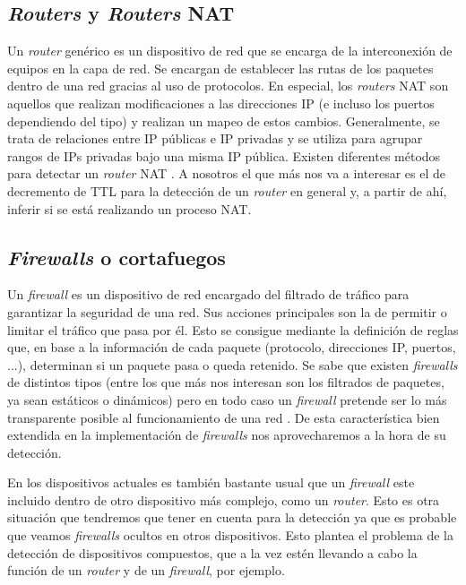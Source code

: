 \documentclass[tfg,epsbased,lof,lot,loa,final,nocopyright,overleaf]{tfgtfmthesisuam}
\begin{document}
\subsection{\textit{Routers} y \textit{Routers} NAT}
Un \textit{router} genérico es un dispositivo de red que se encarga de la interconexión de equipos en la capa de red. Se encargan de establecer las rutas de los paquetes dentro de una red gracias al uso de protocolos. En especial, los \textit{routers} NAT son aquellos que realizan modificaciones a las direcciones IP (e incluso los puertos dependiendo del tipo) y realizan un mapeo de estos cambios. Generalmente, se trata de relaciones entre IP públicas e IP privadas y se utiliza para agrupar rangos de IPs privadas bajo una misma IP pública. Existen diferentes métodos para detectar un \textit{router} NAT \cite{Krmicek}. A nosotros el que más nos va a interesar es el de decremento de TTL para la detección de un \textit{router} en general y, a partir de ahí, inferir si se está realizando un proceso NAT.

\subsection{\textit{Firewalls} o cortafuegos}
\label{subsec:Estado:Deteccion:Firewalls}
Un \textit{firewall} es un dispositivo de red encargado del filtrado de tráfico para garantizar la seguridad de una red. Sus acciones principales son la de permitir o limitar el tráfico que pasa por él. Esto se consigue mediante la definición de reglas que, en base a la información de cada paquete (protocolo, direcciones IP, puertos, ...), determinan si un paquete pasa o queda retenido. Se sabe que existen \textit{firewalls} de distintos tipos (entre los que más nos interesan son los filtrados de paquetes, ya sean estáticos o dinámicos) pero en todo caso un \textit{firewall} pretende ser lo más transparente posible al funcionamiento de una red \cite{Cheswick2003}. De esta característica bien extendida en la implementación de \textit{firewalls} nos aprovecharemos a la hora de su detección.

En los dispositivos actuales es también bastante usual que un \textit{firewall} este incluido dentro de otro dispositivo más complejo, como un \textit{router}. Esto es otra situación que tendremos que tener en cuenta para la detección ya que es probable que veamos \textit{firewalls} ocultos en otros dispositivos. Esto plantea el problema de la detección de dispositivos compuestos, que a la vez estén llevando a cabo la función de un \textit{router} y de un \textit{firewall}, por ejemplo.
\end{document}
